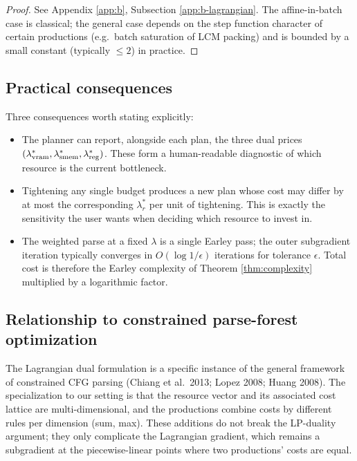 \begin{proof}
  See Appendix \ref{app:b}, Subsection
  \ref{app:b-lagrangian}. The affine-in-batch case
  is classical; the general case depends on the
  step function character of certain productions
  (e.g.\ batch saturation of LCM packing) and is
  bounded by a small constant (typically $\leq 2$)
  in practice.
\end{proof}

\subsection{Practical consequences}

Three consequences worth stating explicitly:

\begin{itemize}[nosep]
  \item The planner can report, alongside each plan,
    the three dual prices $(\lambda_{\operatorname{vram}}^*,
    \lambda_{\operatorname{smem}}^*, \lambda_{\operatorname{reg}}^*)$. These form
    a human-readable diagnostic of which resource is
    the current bottleneck.
  \item Tightening any single budget produces a new
    plan whose cost may differ by at most the
    corresponding $\lambda_r^*$ per unit of tightening.
    This is exactly the sensitivity the user wants
    when deciding which resource to invest in.
  \item The weighted parse at a fixed $\lambda$ is a
    single Earley pass; the outer subgradient
    iteration typically converges in $O(\log 1 /
    \epsilon)$ iterations for tolerance $\epsilon$.
    Total cost is therefore the Earley complexity of
    Theorem \ref{thm:complexity} multiplied by a
    logarithmic factor.
\end{itemize}

\subsection{Relationship to constrained parse-forest optimization}

The Lagrangian dual formulation is a specific instance
of the general framework of constrained CFG parsing
(Chiang et al.\ 2013; Lopez 2008; Huang 2008). The
specialization to our setting is that the resource
vector and its associated cost lattice are
multi-dimensional, and the productions combine costs
by different rules per dimension (sum, max). These
additions do not break the LP-duality argument; they
only complicate the Lagrangian gradient, which remains
a subgradient at the piecewise-linear points where
two productions' costs are equal.
